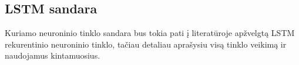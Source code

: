 



\subsection{LSTM sandara}

Kuriamo neuroninio tinklo sandara bus tokia pati į literatūroje apžvelgtą LSTM rekurentinio neuroninio tinklo, tačiau detaliau aprašysiu visą tinklo veikimą ir naudojamus kintamuosius.

